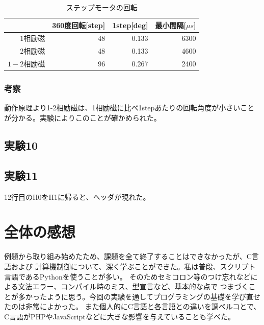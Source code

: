 \documentclass{jarticle}
\begin{document}
\begin{table}[h]
   \begin{center}

       \caption{ステップモータの回転}
        \begin{tabular}{|r|r|r|r|}
         \hline
         & 360度回転[step] & 1step[deg] & 最小間隔[$\mu s$]\\
         \hline
         $1相励磁$ & 48  & 0.133 & 6300\\
         $2相励磁$ & 48  & 0.133 & 4600\\
         $1-2相励磁$ & 96  & 0.267 & 2400\\         
         \hline
        \end{tabular}
       \label{table:Cs137}

   \end{center}
  \end{table}

\subsubsection{考察}
動作原理より1-2相励磁は、1相励磁に比べ1stepあたりの回転角度が小さいことが分かる。実験によりこのことが確かめられた。

\subsection{実験10}



\subsection{実験11}



12行目のH0をH1に帰ると、ヘッダが現れた。

\section{全体の感想}
例題から取り組み始めたため、課題を全て終了することはできなかったが、C言語および
計算機制御について、深く学ぶことができた。私は普段、スクリプト言語であるPythonを使うことが多い。
そのためセミコロン等のつけ忘れなどによる文法エラー、コンパイル時のミス、型宣言など、基本的な点で
つまづくことが多かったように思う。今回の実験を通してプログラミングの基礎を学び直せたのは非常によかった。
また個人的にC言語と各言語との違いを調べルコとで、C言語がPHPやJavaScriptなどに大きな影響を与えていることも学べた。
\end{document}
